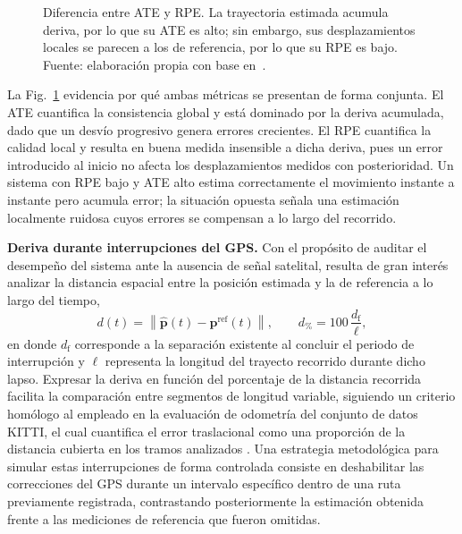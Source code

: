 \begin{figure}[H]
\caption[Diferencia entre ATE y RPE]{Diferencia entre ATE y RPE. La trayectoria estimada acumula deriva, por lo que su ATE es alto; sin embargo, sus desplazamientos locales se parecen a los de referencia, por lo que su RPE es bajo. Fuente: elaboración propia con base en~\cite{sturm2012benchmark}.}
\label{fig:ate-rpe}
\end{figure}

La Fig.~\ref{fig:ate-rpe} evidencia por qué ambas métricas se presentan de forma conjunta.
El ATE cuantifica la consistencia global y está dominado por la deriva acumulada, dado que un desvío progresivo genera errores crecientes.
El RPE cuantifica la calidad local y resulta en buena medida insensible a dicha deriva, pues un error introducido al inicio no afecta los desplazamientos medidos con posterioridad.
Un sistema con RPE bajo y ATE alto estima correctamente el movimiento instante a instante pero acumula error; la situación opuesta señala una estimación localmente ruidosa cuyos errores se compensan a lo largo del recorrido.

\textbf{Deriva durante interrupciones del GPS.}
Con el propósito de auditar el desempeño del sistema ante la ausencia de señal satelital, resulta de gran interés analizar la distancia espacial entre la posición estimada y la de referencia a lo largo del tiempo,
\begin{equation}
d(t) = \left\| \hat{\mathbf{p}}(t) - \mathbf{p}^{\mathrm{ref}}(t) \right\|,
\qquad
d_{\%} = 100\,\frac{d_{\mathrm{f}}}{\ell},
\label{eq:deriva}
\end{equation}
en donde $d_{\mathrm{f}}$ corresponde a la separación existente al concluir el periodo de interrupción y $\ell$ representa la longitud del trayecto recorrido durante dicho lapso.
Expresar la deriva en función del porcentaje de la distancia recorrida facilita la comparación entre segmentos de longitud variable, siguiendo un criterio homólogo al empleado en la evaluación de odometría del conjunto de datos KITTI, el cual cuantifica el error traslacional como una proporción de la distancia cubierta en los tramos analizados \cite{geiger2012kitti}.
Una estrategia metodológica para simular estas interrupciones de forma controlada consiste en deshabilitar las correcciones del GPS durante un intervalo específico dentro de una ruta previamente registrada, contrastando posteriormente la estimación obtenida frente a las mediciones de referencia que fueron omitidas.

